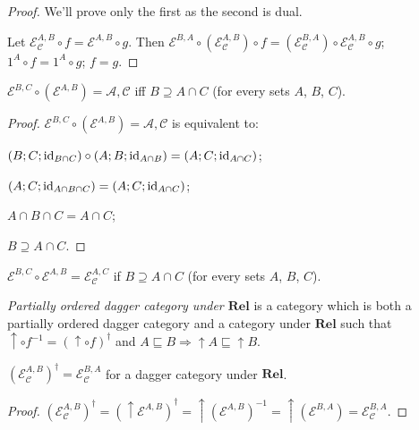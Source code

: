 \begin{proof}
  We'll prove only the first as the second is dual.
  
  Let $\mathcal{E}_{\mathcal{C}}^{A,B} \circ f = \mathcal{E}^{A,B} \circ g$. Then
  $\mathcal{E}^{B,A} \circ (\mathcal{E}_{\mathcal{C}}^{A,B})
  \circ f = (\mathcal{E}_{\mathcal{C}}^{B,A}) \circ \mathcal{E}_{\mathcal{C}}^{A,B} \circ g$;
  $1^A \circ f = 1^A \circ g$; $f = g$.
\end{proof}

\begin{prop}
  $\mathcal{E}^{B,C} \circ (\mathcal{E}^{A,B}) = \mathcal{A,C}$
  iff $B \supseteq A \cap C$ (for every sets $A$, $B$, $C$).
\end{prop}

\begin{proof}
  $\mathcal{E}^{B,C} \circ (\mathcal{E}^{A,B}) = \mathcal{A,C}$
  is equivalent to:
  
  $(B ; C ; \operatorname{id}_{B \cap C}) \circ (A ; B ; \operatorname{id}_{A \cap B}) = (A ;
  C ; \operatorname{id}_{A \cap C})$;
  
  $(A ; C ; \operatorname{id}_{A \cap B \cap C}) = (A ; C ; \operatorname{id}_{A \cap C})$;
  
  $A \cap B \cap C = A \cap C$;
  
  $B \supseteq A \cap C$.
\end{proof}

\begin{cor}
  $\mathcal{E}^{B,C} \circ \mathcal{E}^{A,B} = \mathcal{E}_{\mathcal{C}}^{A,C}$ if
  $B \supseteq A \cap C$ (for every sets $A$, $B$, $C$).
\end{cor}

\begin{defn}
  \emph{Partially ordered dagger category under $\mathbf{Rel}$} is
  a category which is both a partially ordered dagger category and a category
  under $\mathbf{Rel}$ such that $\uparrow \circ f^{- 1} = (\uparrow
  \circ f)^{\dagger}$ and $A \sqsubseteq B \Rightarrow \uparrow A \sqsubseteq
  \uparrow B$.
\end{defn}

\begin{prop}
  $(\mathcal{E}_{\mathcal{C}}^{A,B})^{\dagger} = \mathcal{E}_{\mathcal{C}}^{B,A}$ for a dagger category under
  $\mathbf{Rel}$.
\end{prop}

\begin{proof}
  $(\mathcal{E}_{\mathcal{C}}^{A,B})^{\dagger} = (\uparrow \mathcal{E}^{A,B})^{\dagger} = \uparrow (\mathcal{E}^{A,B})^{- 1} =
  \uparrow (\mathcal{E}^{B,A}) = \mathcal{E}_{\mathcal{C}}^{B,A}$.
\end{proof}

